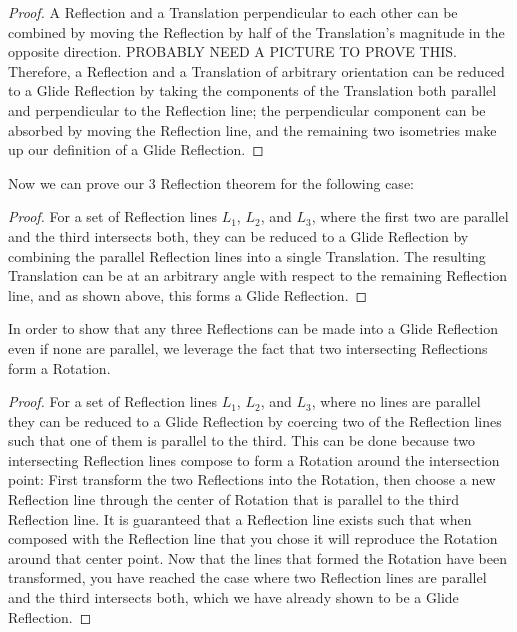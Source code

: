 \documentclass[11pt]{article}
\theoremstyle{definition}
\begin{document}
\begin{proof}
  A Reflection and a Translation perpendicular to each other can be combined by
  moving the Reflection by half of the Translation's magnitude in the opposite
  direction.
  PROBABLY NEED A PICTURE TO PROVE THIS.
  Therefore, a Reflection and a Translation of arbitrary orientation can be
  reduced to a Glide Reflection by taking the components of the Translation
  both parallel and perpendicular to the Reflection line; the perpendicular
  component can be absorbed by moving the Reflection line, and the remaining
  two isometries make up our definition of a Glide Reflection.
\end{proof}

Now we can prove our 3 Reflection theorem for the following case:

\begin{proof}
  For a set of Reflection lines $L_{1}$, $L_{2}$, and $L_{3}$, where the first
  two are parallel and the third intersects both, they can be reduced to a
  Glide Reflection by combining the parallel Reflection lines into a single
  Translation. The resulting Translation can be at an arbitrary angle with
  respect to the remaining Reflection line, and as shown above, this forms a
  Glide Reflection.
\end{proof}

In order to show that any three Reflections can be made into a Glide
Reflection even if none are parallel, we leverage the fact that two
intersecting Reflections form a Rotation.

\begin{proof}
  For a set of Reflection lines $L_{1}$, $L_{2}$, and $L_{3}$, where no lines
  are parallel they can be reduced to a
  Glide Reflection by coercing two of the Reflection lines such that one of
  them is parallel to the third. This can be done because two intersecting
  Reflection lines compose to form a Rotation around the intersection point:
  First transform the two Reflections into the Rotation, then choose a new
  Reflection line through the center of Rotation that is parallel to the third
  Reflection line. It is guaranteed that a Reflection line exists such that
  when composed with the Reflection line that you chose it will reproduce the
  Rotation around that center point. Now that the lines that formed the
  Rotation have been transformed, you have reached the case where two
  Reflection lines are parallel and the third intersects both, which we have
  already shown to be a Glide Reflection.
\end{proof}
\end{document}
